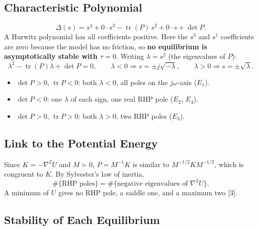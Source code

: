 \documentclass[12pt,a4paper]{article}
\begin{document}
\subsection{Characteristic Polynomial}
\begin{equation}
\Delta(s)=s^4+0\cdot s^3-\operatorname{tr}(P)\,s^2+0\cdot s+\det P .
\end{equation}
A Hurwitz polynomial has all coefficients positive. Here the $s^3$ and $s^1$ coefficients are zero because the model has no friction, so \textbf{no equilibrium is asymptotically stable with $\tau=0$}. Writing $\lambda=s^2$ (the eigenvalues of $P$):
\begin{equation}
\lambda^2-\operatorname{tr}(P)\lambda+\det P=0,\qquad \lambda<0\Rightarrow s=\pm j\sqrt{-\lambda},\qquad \lambda>0\Rightarrow s=\pm\sqrt\lambda .
\end{equation}
\begin{itemize}
\item $\det P>0$, $\operatorname{tr}P<0$: both $\lambda<0$, all poles on the $j\omega$-axis ($E_1$).
\item $\det P<0$: one $\lambda$ of each sign, one real RHP pole ($E_2$, $E_4$).
\item $\det P>0$, $\operatorname{tr}P>0$: both $\lambda>0$, two RHP poles ($E_3$).
\end{itemize}

\subsection{Link to the Potential Energy}
Since $K=-\nabla^2U$ and $M\succ0$, $P=M^{-1}K$ is similar to $M^{-1/2}KM^{-1/2}$, which is congruent to $K$. By Sylvester's law of inertia,
\begin{equation}
\#\{\text{RHP poles}\}=\#\{\text{negative eigenvalues of }\nabla^2U\}.
\end{equation}
A minimum of $U$ gives no RHP pole, a saddle one, and a maximum two [3].

\subsection{Stability of Each Equilibrium}
\begin{table}[H]
\centering
\caption{Stability of the four equilibria}
\label{tab:stab}
\small
{}
\end{table}
\end{document}
